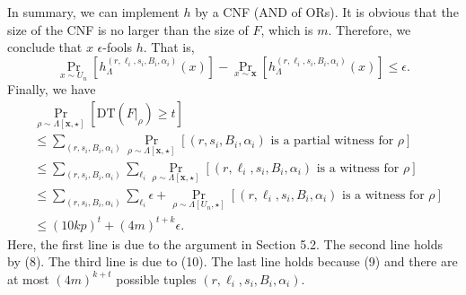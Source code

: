 In summary, we can implement $h$ by a CNF (AND of ORs). It is obvious that the size of the CNF is no larger than the size of $F$, which is $m$. Therefore, we conclude that $x$ $\epsilon$-fools $h$. That is,
\[\Pr_{x\sim U_n}[h_\Lambda^{(r,\ell_i,s_i,B_i,\alpha_i)}(x)]-\Pr_{x\sim\boldsymbol x}[h_\Lambda^{(r,\ell_i,s_i,B_i,\alpha_i)}(x)]\le\epsilon.\tag{10}\]
Finally, we have
\begin{align*}&\Pr_{\rho\sim\Lambda[\boldsymbol x,\star]}[\mathrm{DT}(F|_\rho)\ge t]\\&\le\sum_{(r,s_i,B_i,\alpha_i)}\Pr_{\rho\sim\Lambda[\boldsymbol x,\star]}[(r,s_i,B_i,\alpha_i)\text{ is a partial witness for }\rho]\\&\le\sum_{(r,s_i,B_i,\alpha_i)}\sum_{\ell_i}\Pr_{\rho\sim\Lambda[\boldsymbol x,\star]}[(r,\ell_i,s_i,B_i,\alpha_i)\text{ is a witness for }\rho]\\&\le\sum_{(r,s_i,B_i,\alpha_i)}\sum_{\ell_i}\epsilon+\Pr_{\rho\sim\Lambda[U_n,\star]}[(r,\ell_i,s_i,B_i,\alpha_i)\text{ is a witness for }\rho]\\&\le(10kp)^t+(4m)^{t+k}\epsilon.\end{align*}
Here, the first line is due to the argument in Section 5.2. The second line holds by (8). The third line is due to (10). The last line holds because (9) and there are at most $(4m)^{k+t}$ possible tuples $(r,\ell_i,s_i,B_i,\alpha_i)$.
